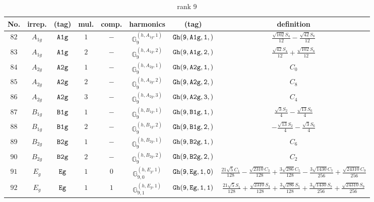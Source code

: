\documentclass[fleqn,8pt]{jsarticle}
\begin{document}
\begin{table}[ht!]
\begin{center}
\caption{rank 9}
\renewcommand{\arraystretch}{1.3}
\begin{tabular}{cccccccc} \hline \hline
No. & irrep. & (tag) & mul. & comp. & harmonics & (tag) & definition \\ \hline
$ 82 $ & $ A_{1g} $ & $ {\tt A1g} $ & $ 1 $ & $ - $ & $ \mathbb{G}_{9}^{(h,A_{1g},1)} $ & $ {\tt Gh(9,A1g,1,)} $ & $ \frac{\sqrt{102} S_{4}}{12} - \frac{\sqrt{42} S_{8}}{12} $ \\
$ 83 $ & $ A_{1g} $ & $ {\tt A1g} $ & $ 2 $ & $ - $ & $ \mathbb{G}_{9}^{(h,A_{1g},2)} $ & $ {\tt Gh(9,A1g,2,)} $ & $ \frac{\sqrt{42} S_{4}}{12} + \frac{\sqrt{102} S_{8}}{12} $ \\
$ 84 $ & $ A_{2g} $ & $ {\tt A2g} $ & $ 1 $ & $ - $ & $ \mathbb{G}_{9}^{(h,A_{2g},1)} $ & $ {\tt Gh(9,A2g,1,)} $ & $ C_{0} $ \\
$ 85 $ & $ A_{2g} $ & $ {\tt A2g} $ & $ 2 $ & $ - $ & $ \mathbb{G}_{9}^{(h,A_{2g},2)} $ & $ {\tt Gh(9,A2g,2,)} $ & $ C_{8} $ \\
$ 86 $ & $ A_{2g} $ & $ {\tt A2g} $ & $ 3 $ & $ - $ & $ \mathbb{G}_{9}^{(h,A_{2g},3)} $ & $ {\tt Gh(9,A2g,3,)} $ & $ C_{4} $ \\
$ 87 $ & $ B_{1g} $ & $ {\tt B1g} $ & $ 1 $ & $ - $ & $ \mathbb{G}_{9}^{(h,B_{1g},1)} $ & $ {\tt Gh(9,B1g,1,)} $ & $ \frac{\sqrt{3} S_{2}}{4} - \frac{\sqrt{13} S_{6}}{4} $ \\
$ 88 $ & $ B_{1g} $ & $ {\tt B1g} $ & $ 2 $ & $ - $ & $ \mathbb{G}_{9}^{(h,B_{1g},2)} $ & $ {\tt Gh(9,B1g,2,)} $ & $ - \frac{\sqrt{13} S_{2}}{4} - \frac{\sqrt{3} S_{6}}{4} $ \\
$ 89 $ & $ B_{2g} $ & $ {\tt B2g} $ & $ 1 $ & $ - $ & $ \mathbb{G}_{9}^{(h,B_{2g},1)} $ & $ {\tt Gh(9,B2g,1,)} $ & $ C_{6} $ \\
$ 90 $ & $ B_{2g} $ & $ {\tt B2g} $ & $ 2 $ & $ - $ & $ \mathbb{G}_{9}^{(h,B_{2g},2)} $ & $ {\tt Gh(9,B2g,2,)} $ & $ C_{2} $ \\
$ 91 $ & $ E_{g} $ & $ {\tt Eg} $ & $ 1 $ & $ 0 $ & $ \mathbb{G}_{9,0}^{(h,E_{g},1)} $ & $ {\tt Gh(9,Eg,1,0)} $ & $ \frac{21 \sqrt{5} C_{1}}{128} - \frac{\sqrt{2310} C_{3}}{128} + \frac{3 \sqrt{286} C_{5}}{128} - \frac{3 \sqrt{1430} C_{7}}{256} + \frac{\sqrt{24310} C_{9}}{256} $ \\
$ 92 $ & $ E_{g} $ & $ {\tt Eg} $ & $ 1 $ & $ 1 $ & $ \mathbb{G}_{9,1}^{(h,E_{g},1)} $ & $ {\tt Gh(9,Eg,1,1)} $ & $ \frac{21 \sqrt{5} S_{1}}{128} + \frac{\sqrt{2310} S_{3}}{128} + \frac{3 \sqrt{286} S_{5}}{128} + \frac{3 \sqrt{1430} S_{7}}{256} + \frac{\sqrt{24310} S_{9}}{256} $ \\

\end{tabular}
\end{center}
\end{table}
\end{document}
